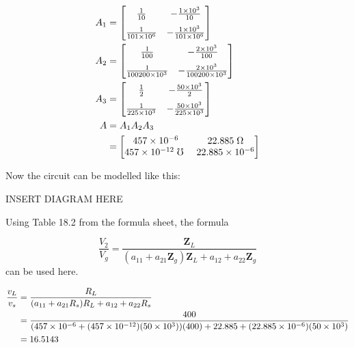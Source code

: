 \begin{enumerate}
{	\begin{align*}
	A_1 &= 
	\left[ \begin{matrix}
	\frac{1}{\Aone} 			& -\frac{\Roone}{\Aone} \\[6pt] 
	\frac{1}{\Aone \Rione }		& -\frac{\Roone}{\Aone \Rione}
	\end{matrix}  \right] 
	\\
	A_2 &= 
	\left[ \begin{matrix}
	\frac{1}{\Atwo} 			& -\frac{\Rotwo}{\Atwo} \\[6pt] 
	\frac{1}{\Atwo \Ritwo }		& -\frac{\Rotwo}{\Atwo \Ritwo}
	\end{matrix}  \right] 
	\\
	A_3 &= 
	\left[ \begin{matrix}
	\frac{1}{\Athree} 			& -\frac{\Rothree}{\Athree} \\[6pt] 
	\frac{1}{\Athree \Rithree }	& -\frac{\Rothree}{\Athree \Rithree}
	\end{matrix}  \right] 
	\\
	A &= A_1 A_2 A_3
	\\
	&= \left[ \begin{matrix}
	\Aoneone 			& \Aonetwo \; \Omega \\ 
	\Atwoone \; \mho \	& \Atwotwo
	\end{matrix}  \right] 
	\end{align*}
	
	Now the circuit can be modelled like this:
	
	INSERT DIAGRAM HERE
	
	Using Table 18.2 from the formula sheet, the formula
	
	$$ \frac{V_2}{V_g} = \frac{\mathbf{Z}_L}{(a_{11} + a_{21}\mathbf{Z}_g)\mathbf{Z}_L + a_{12} + a_{22}\mathbf{Z}_g} $$
	can be used here.
	
	\begin{align*}
	\frac{v_L}{v_s} &= \frac{R_L}{(a_{11} + a_{21}R_s)R_L + a_{12} + a_{22}R_s}
	\\
	&= \frac{400}{(457 \times 10^{-6} + (457 \times 10^{-12})(50 \times 10^3))(400) + 22.885 + (22.885 \times 10^{-6})(50 \times 10^3)}
	\\
	&= 16.5143
	\end{align*}
	
	}
\end{enumerate}